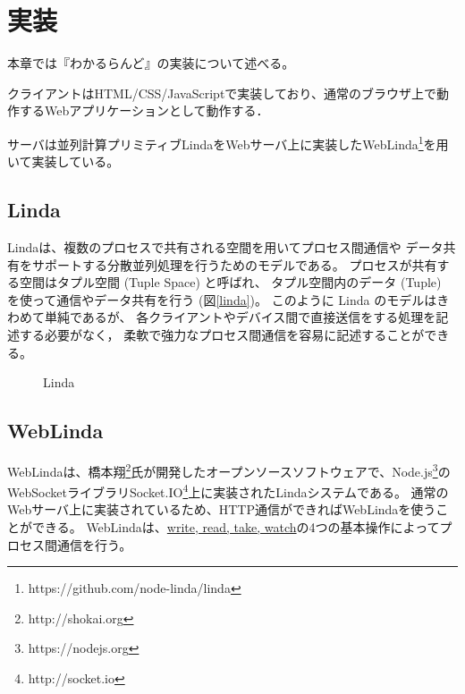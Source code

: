 \section{実装}
本章では『わかるらんど』の実装について述べる。

クライアントはHTML/CSS/JavaScriptで実装しており、通常のブラウザ上で動作するWebアプリケーションとして動作する．

サーバは並列計算プリミティブLindaをWebサーバ上に実装したWebLinda\footnote{https://github.com/node-linda/linda}を用いて実装している。

\subsection{Linda}
Lindaは、複数のプロセスで共有される空間を用いてプロセス間通信や
データ共有をサポートする分散並列処理を行うためのモデルである。
プロセスが共有する空間はタプル空間 (Tuple Space) と呼ばれ、
タプル空間内のデータ (Tuple) を使って通信やデータ共有を行う (図\ref{linda})。
このように Linda のモデルはきわめて単純であるが、
各クライアントやデバイス間で直接送信をする処理を記述する必要がなく，
柔軟で強力なプロセス間通信を容易に記述することができる。

\begin{figure}[h]
\centering
{}
\caption{Linda}
\label{button}
\end{figure}

\subsection{WebLinda}
WebLindaは、橋本翔\footnote{http://shokai.org}氏が開発したオープンソースソフトウェアで、Node.js\footnote{https://nodejs.org}のWebSocketライブラリSocket.IO\footnote{http://socket.io}上に実装されたLindaシステムである。
通常のWebサーバ上に実装されているため、HTTP通信ができればWebLindaを使うことができる。
WebLindaは、\url{write, read, take, watch}の4つの基本操作によってプロセス間通信を行う。

\vspace{2mm}
